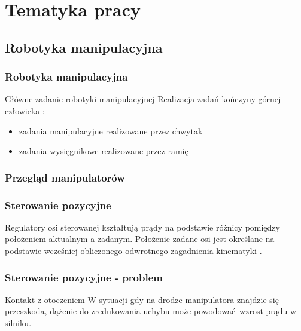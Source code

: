 \section{Tematyka pracy}

\subsection{Robotyka manipulacyjna}

\begin{frame}
\frametitle{Robotyka manipulacyjna}
\begin{block}{Główne zadanie robotyki manipulacyjnej}
Realizacja zadań kończyny górnej człowieka \cite{siewruk}:
\begin{itemize}
	\item zadania manipulacyjne realizowane przez chwytak
	\item zadania wysięgnikowe realizowane przez ramię
\end{itemize}
\end{block}
\end{frame}


\begin{frame}
\frametitle{Przegląd manipulatorów}

\end{frame}


\begin{frame}
\frametitle{Sterowanie pozycyjne}

\begin{block}{}
Regulatory osi sterowanej kształtują prądy na podstawie różnicy pomiędzy położeniem aktualnym a zadanym.
Położenie zadane osi jest określane na podstawie wcześniej obliczonego odwrotnego zagadnienia kinematyki \cite{sterowanie}.
\end{block}

\end{frame}


\begin{frame}
\frametitle{Sterowanie pozycyjne - problem}

\begin{block}{Kontakt z otoczeniem}
W sytuacji gdy na drodze manipulatora znajdzie się przeszkoda, dążenie do zredukowania uchybu może powodować wzrost prądu
w silniku.
\end{block}

\end{frame}

